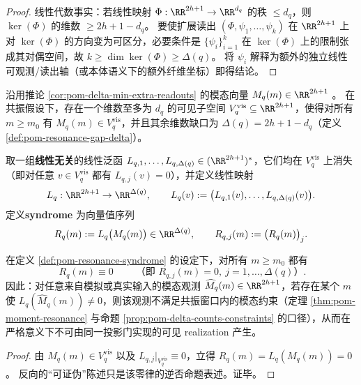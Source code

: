 \begin{proof}
线性代数事实：若线性映射 \(\Phi:\RR^{2h+1}\to\RR^{d_q}\) 的秩 \(\le d_q\)，则 \(\ker(\Phi)\) 的维数 \(\ge 2h+1-d_q\)。
要使扩展读出 \((\Phi,\psi_1,\ldots,\psi_k)\) 在 \(\RR^{2h+1}\) 上对 \(\ker(\Phi)\) 的方向变为可区分，必要条件是
\(\{\psi_i\}_{i=1}^k\) 在 \(\ker(\Phi)\) 上的限制张成其对偶空间，故 \(k\ge \dim\ker(\Phi)\ge \Delta(q)\)。
将 \(\psi_i\) 解释为额外的独立线性可观测/读出轴（或本体语义下的额外纤维坐标）即得结论。
\end{proof}


\begin{definition}\label{def:pom-resonance-syndrome}
沿用推论 \ref{cor:pom-delta-min-extra-readouts} 的模态向量
\(
M_q(m)\in\RR^{2h+1}
\)
。
在共振假设下，存在一个维数至多为 \(d_q\) 的可见子空间 \(V_q^{\mathrm{vis}}\subseteq\RR^{2h+1}\)，使得对所有 \(m\ge m_0\) 有 \(M_q(m)\in V_q^{\mathrm{vis}}\)，并且其余维数缺口为 \(\Delta(q)=2h+1-d_q\)（定义 \ref{def:pom-resonance-gap-delta}）。
\par
取一组\textbf{线性无关}的线性泛函 \(L_{q,1},\dots,L_{q,\Delta(q)}\in(\RR^{2h+1})^\ast\)，它们均在 \(V_q^{\mathrm{vis}}\) 上消失（即对任意 \(v\in V_q^{\mathrm{vis}}\) 都有 \(L_{q,j}(v)=0\)），并定义线性映射
\[
L_q:\RR^{2h+1}\to\RR^{\Delta(q)},\qquad
L_q(v):=\bigl(L_{q,1}(v),\dots,L_{q,\Delta(q)}(v)\bigr).
\]
定义\textbf{syndrome} 为向量值序列
\[
R_q(m):=L_q\bigl(M_q(m)\bigr)\in\RR^{\Delta(q)},
\qquad
R_{q,j}(m):=\bigl(R_q(m)\bigr)_j.
\]
\end{definition}

\begin{corollary}\label{cor:pom-resonance-syndrome-audit}
在定义 \ref{def:pom-resonance-syndrome} 的设定下，对所有 \(m\ge m_0\) 都有
\[
\boxed{\;R_q(m)\equiv 0\;}
\qquad\text{（即 }R_{q,j}(m)=0,\ j=1,\dots,\Delta(q)\text{）}.
\]
因此：对任意来自模拟或真实输入的模态观测 \(\widehat M_q(m)\in\RR^{2h+1}\)，若存在某个 \(m\) 使 \(L_q(\widehat M_q(m))\neq 0\)，则该观测不满足共振窗口内的模态约束（定理 \ref{thm:pom-moment-resonance} 与命题 \ref{prop:pom-delta-counts-constraints} 的口径），从而在严格意义下不可由同一投影门实现的可见 realization 产生。
\end{corollary}
\begin{proof}
由 \(M_q(m)\in V_q^{\mathrm{vis}}\) 以及 \(L_{q,j}|_{V_q^{\mathrm{vis}}}\equiv 0\)，立得 \(R_q(m)=L_q(M_q(m))=0\)。
反向的“可证伪”陈述只是该零律的逆否命题表述。证毕。
\end{proof}

